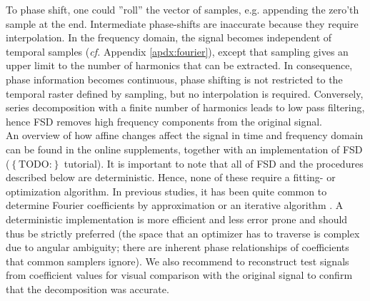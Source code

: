 \documentclass[10pt, a4paper]{article}
\newcommand{\todo}[1]{\colorbox{terracotta!30!yellow}{\footnotesize{$\left\lbrace\text{TODO:}\right\rbrace$ }#1\normalsize}}
\begin{document}
\begin{linenumbers}[1]
To phase shift, one could ''roll'' the vector of samples, e.g. appending the zero'th sample at the end. 
Intermediate phase-shifts are inaccurate because they require interpolation. 
In the frequency domain, the signal becomes independent of temporal samples (\textit{cf.} Appendix \ref{apdx:fourier}), except that sampling gives an upper limit to the number of harmonics that can be extracted. 
In consequence, phase information becomes continuous, phase shifting is not restricted to the temporal raster defined by sampling, but no interpolation is required. 
Conversely, series decomposition with a finite number of harmonics leads to low pass filtering, hence FSD removes high frequency components from the original signal. 
\\An overview of how affine changes affect the signal in time and frequency domain can be found in the online supplements, together with an implementation of FSD (\todo{tutorial}). 
It is important to note that all of FSD and the procedures described below are deterministic. 
Hence, none of these require a fitting- or optimization algorithm. 
In previous studies, it has been quite common to determine Fourier coefficients by approximation \citep[e.g.][]{Alexander1980} or an iterative algorithm \citep[regression, e.g.][]{Hubel2015}. 
A deterministic implementation is more efficient and less error prone and should thus be strictly preferred (the space that an optimizer has to traverse is complex due to angular ambiguity; there are inherent phase relationships of coefficients that common samplers ignore). 
We also recommend to reconstruct test signals from coefficient values for visual comparison with the original signal to confirm that the decomposition was accurate. 




\end{linenumbers}
\end{document}
